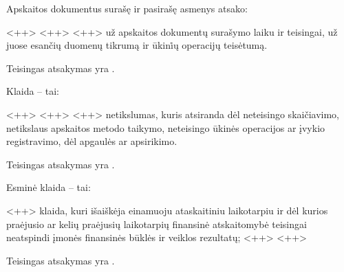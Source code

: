 \begin{tasks}
  \begin{task}
    \begin{condition}
      Apskaitos dokumentus surašę ir pasirašę asmenys atsako:
      \begin{enumerate}
         <++>
         <++>
         <++>
         už apskaitos dokumentų surašymo laiku ir teisingai,
          už juose esančių duomenų tikrumą ir ūkini̇ų operacijų
          teisėtumą.
      \end{enumerate}
    \end{condition}
    \begin{solution}
      Teisingas atsakymas yra .
    \end{solution}
  \end{task}

  \begin{task}
    \begin{condition}
      Klaida – tai:
      \begin{enumerate}
         <++>
         <++>
         <++>
         netikslumas, kuris atsiranda dėl neteisingo skaičiavimo,
          netikslaus apskaitos metodo taikymo, neteisingo ūkinės
          operacijos ar įvykio registravimo, dėl apgaulės ar
          apsirikimo.
      \end{enumerate}
    \end{condition}
    \begin{solution}
      Teisingas atsakymas yra .
    \end{solution}
  \end{task}

  \begin{task}
    \begin{condition}
      Esminė klaida – tai:
      \begin{enumerate}
         <++>
         klaida, kuri išaiškėja einamuoju ataskaitiniu
          laikotarpiu ir dėl kurios praėjusio ar kelių praėjusių
          laikotarpių finansinė atskaitomybė teisingai neatspindi
          įmonės finansinės būklės ir veiklos rezultatų;
         <++>
         <++>
      \end{enumerate}
    \end{condition}
    \begin{solution}
      Teisingas atsakymas yra .
    \end{solution}
  \end{task}

\end{tasks}
